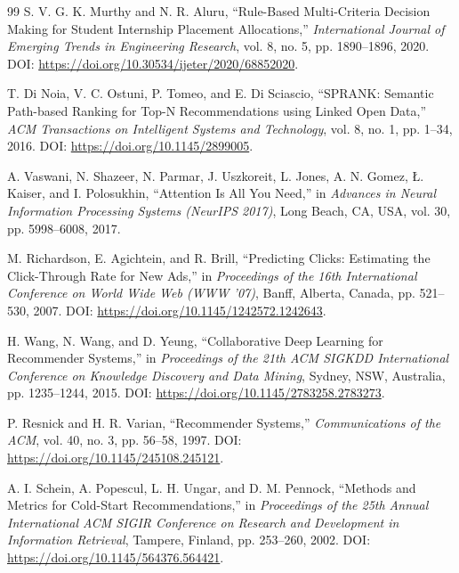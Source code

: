 \begin{thebibliography}{99}
S. V. G. K. Murthy and N. R. Aluru, “Rule-Based Multi-Criteria Decision Making for Student Internship Placement Allocations,” \emph{International Journal of Emerging Trends in Engineering Research}, vol. 8, no. 5, pp. 1890--1896, 2020. DOI: \url{https://doi.org/10.30534/ijeter/2020/68852020}.

T. Di Noia, V. C. Ostuni, P. Tomeo, and E. Di Sciascio, “SPRANK: Semantic Path-based Ranking for Top-N Recommendations using Linked Open Data,” \emph{ACM Transactions on Intelligent Systems and Technology}, vol. 8, no. 1, pp. 1--34, 2016. DOI: \url{https://doi.org/10.1145/2899005}.

A. Vaswani, N. Shazeer, N. Parmar, J. Uszkoreit, L. Jones, A. N. Gomez, {\L}. Kaiser, and I. Polosukhin, “Attention Is All You Need,” in \emph{Advances in Neural Information Processing Systems (NeurIPS 2017)}, Long Beach, CA, USA, vol. 30, pp. 5998--6008, 2017.

M. Richardson, E. Agichtein, and R. Brill, “Predicting Clicks: Estimating the Click-Through Rate for New Ads,” in \emph{Proceedings of the 16th International Conference on World Wide Web (WWW '07)}, Banff, Alberta, Canada, pp. 521--530, 2007. DOI: \url{https://doi.org/10.1145/1242572.1242643}.

H. Wang, N. Wang, and D. Yeung, “Collaborative Deep Learning for Recommender Systems,” in \emph{Proceedings of the 21th ACM SIGKDD International Conference on Knowledge Discovery and Data Mining}, Sydney, NSW, Australia, pp. 1235--1244, 2015. DOI: \url{https://doi.org/10.1145/2783258.2783273}.

P. Resnick and H. R. Varian, “Recommender Systems,” \emph{Communications of the ACM}, vol. 40, no. 3, pp. 56--58, 1997. DOI: \url{https://doi.org/10.1145/245108.245121}.

A. I. Schein, A. Popescul, L. H. Ungar, and D. M. Pennock, “Methods and Metrics for Cold-Start Recommendations,” in \emph{Proceedings of the 25th Annual International ACM SIGIR Conference on Research and Development in Information Retrieval}, Tampere, Finland, pp. 253--260, 2002. DOI: \url{https://doi.org/10.1145/564376.564421}.

\end{thebibliography}

